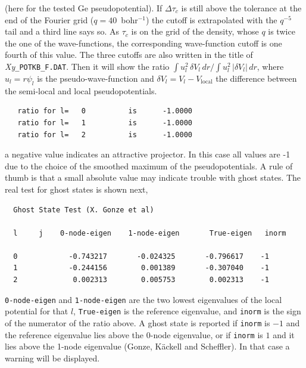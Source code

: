 \documentclass[11pt]{article}
\begin{document}
(here for the tested Ge pseudopotential).  If $\Delta \tau_c$ is still above the tolerance at the
end of the Fourier grid ($q = 40$~bohr$^{-1}$) the cutoff is extrapolated with the $q^{-5}$ tail
and a third line says so.  As $\tau_c$ is on the grid of the density, whose $q$ is twice the one of
the wave-functions, the corresponding wave-function cutoff is one fourth of this value.
The three cutoffs are also written in the title of \textit{Xy}\texttt{\_POTKB\_F.DAT}.
Then it will
show the ratio $\int u_l^2\, \delta V_l\, dr / \int u_l^2\, |\delta V_l|\, dr$,
where $u_l = r \psi_l$ is the pseudo-wave-function and $\delta V_l = V_l - V_\text{local}$
the difference between the semi-local and local pseudopotentials.
\begin{verbatim}
   ratio for l=   0          is      -1.0000
   ratio for l=   1          is      -1.0000
   ratio for l=   2          is      -1.0000
\end{verbatim}
a negative value indicates an attractive projector.
In this case all values are -1 due to the choice of
the smoothed maximum of the pseudopotentials.
A rule of thumb is that a small absolute value
may indicate trouble with ghost states.
The real test for ghost states is shown next,
\begin{verbatim}
  Ghost State Test (X. Gonze et al)

  l     j    0-node-eigen    1-node-eigen       True-eigen   inorm

  0            -0.743217       -0.024325       -0.796617    -1
  1            -0.244156        0.001389       -0.307040    -1
  2             0.002313        0.005753        0.002313    -1
\end{verbatim}
\texttt{0-node-eigen} and \texttt{1-node-eigen} are the two lowest eigenvalues
of the local potential for that $l$, \texttt{True-eigen} is the reference eigenvalue,
and \texttt{inorm} is the sign of the numerator of the ratio above.
A ghost state is reported if \texttt{inorm} is $-1$ and the reference eigenvalue lies above
the 0-node eigenvalue, or if \texttt{inorm} is $1$ and it lies above the 1-node eigenvalue
(Gonze, K\"ackell and Scheffler).  In that case a warning will be displayed.
\end{document}
